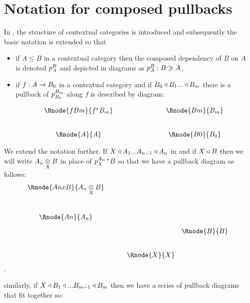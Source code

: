 \documentclass[10pt,a4paper]{scrartcl}
\begin{document}
\section{Notation for composed pullbacks}
In \cite{Cartmell86}, the structure of contextual categories is introduced and subsequently
the basic notation is extended so that 
\begin{itemize}
\item{if $A \leq B$ in a contextual category then the composed dependency of
$B$ on $A$ is 
denoted $\pc{B}{A}$ and depicted in diagrams as $\pc{B}{A}:B \raisebox{1pt}{---}\!\!\!\!\!\!\geqslant A$,}
\item{if $f: A \morph B_0$ in a contextual category  and if 
$B_0 \base B_1 ... \base B_m$ there is a  pullback of $\pc{B_m}{B_0}$ along $f$
is described by diagram:

\begin{displaymath}
\begin{array}{cp{2cm}c}
\Rnode{fBm} {f \sub B_m}    &            &  \Rnode{Bm}{B_m}   \\ [0.8cm]
\Rnode{A}{A}                &            &  \Rnode{B0}{B_0}   
\end{array}
\end{displaymath}
}
\end{itemize}


We extend the notation further. If $X \base A_1 ... A_{n-1} \base A_n$ in  and
if $X \base B$ then we will write $\crossx{A_n}{B}{X}$ in place of $\pc{A_n}{X}\,\sub B$ so that 
we have a pullback diagram as follows:
\begin{displaymath}
\begin{array}{c p{0.45cm} c c}
\Rnode{AnxB}{\crossx{A_n}{B}{X}}&&            &              \\ [1.1cm]
\Rnode{An}{A_n}                 &&            &               \\ [0.3cm]
                                &&            & \Rnode{B}{B}  \\ [0.8cm]
                                &&\Rnode{X}{X}&                
\end{array}
\end{displaymath}
.

similarly, if $X \base B_1 \base ... B_{m-1} \base B_m$ then we have a series of pullback diagrams that fit together so:
\end{document}
